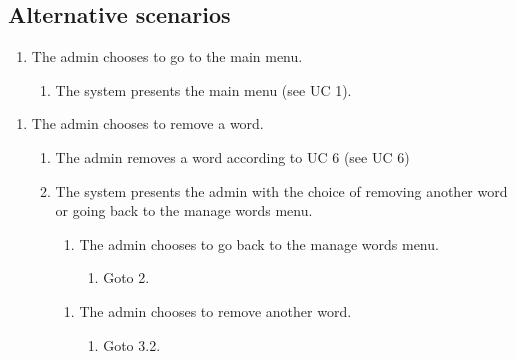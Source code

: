\documentclass[12pt, letterpaper]{article}
\begin{document}
\subsection{Alternative scenarios}
\begin{enumerate}[label=3.1.]
	\item The admin chooses to go to the main menu. 
	\begin{enumerate}[label=3.1.\arabic*]
		\item The system presents the main menu (see UC 1).
	\end{enumerate}
\end{enumerate}
\begin{enumerate}[label=3.2.]
	\item The admin chooses to remove a word. 
	\begin{enumerate}[label=3.2.\arabic*]
		\item The admin removes a word according to UC 6 (see UC 6)
		\item The system presents the admin with the choice of removing another word or going back to the manage words menu.
		\begin{enumerate}[label=3.2.2.a]
			\item The admin chooses to go back to the manage words menu.
			\begin{enumerate}[label=3.2.2.a.1]
				\item Goto 2.
			\end{enumerate}
		\end{enumerate}
		\begin{enumerate}[label=3.2.2.b]
			\item The admin chooses to remove another word.
			\begin{enumerate}[label=3.2.2.b.1]
				\item Goto 3.2.
			\end{enumerate}
		\end{enumerate}
	\end{enumerate}
\end{enumerate}
\end{document}

